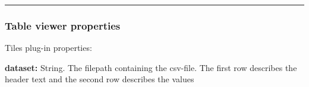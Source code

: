 \begin{center}\rule{0.5\linewidth}{0.5pt}\end{center}

\hypertarget{table-viewer-properties}{%
\subsubsection{Table viewer properties}\label{table-viewer-properties}}

Tiles plug-in properties:

\textbf{dataset:} String. The filepath containing the csv-file. The
first row describes the header text and the second row describes the
values

